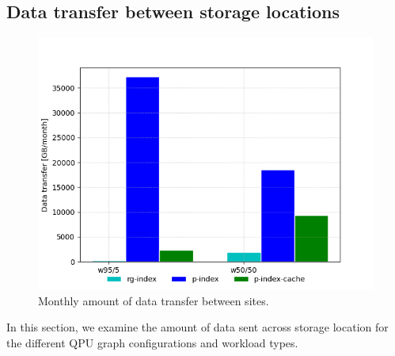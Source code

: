 \subsection{Data transfer between storage locations}


\begin{figure}[H]
  \centering
    \includegraphics[scale=0.5]{./figures/evaluation/ycsb_datatransfer.png}
  \caption{Monthly amount of data transfer between sites.}
  \label{fig:ycsb_datatransfer}
\end{figure}

In this section, we examine the amount of data sent across storage location for the different QPU graph configurations and
workload types.

